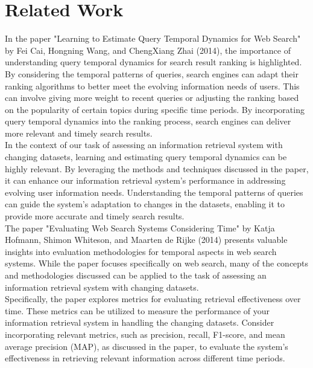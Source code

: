 \section{Related Work}
\label{sec:related}


In the paper "Learning to Estimate Query Temporal Dynamics for Web Search" by Fei Cai, 
Hongning Wang, and ChengXiang Zhai (2014), the importance of understanding query temporal 
dynamics for search result ranking is highlighted. By considering the temporal patterns of 
queries, search engines can adapt their ranking algorithms to better meet the evolving information 
needs of users. This can involve giving more weight to recent queries or adjusting the ranking 
based on the popularity of certain topics during specific time periods. By incorporating query 
temporal dynamics into the ranking process, search engines can deliver more relevant and timely 
search results.\\

In the context of our task of assessing an information retrieval system with changing datasets, 
learning and estimating query temporal dynamics can be highly relevant. By leveraging the methods 
and techniques discussed in the paper, it can enhance our information retrieval system's performance 
in addressing evolving user information needs. Understanding the temporal patterns of queries can 
guide the system's adaptation to changes in the datasets, enabling it to provide more accurate and 
timely search results. \\


The paper "Evaluating Web Search Systems Considering Time" by Katja Hofmann, Shimon Whiteson, and 
Maarten de Rijke (2014) presents valuable insights into evaluation methodologies for temporal aspects 
in web search systems. While the paper focuses specifically on web search, many of the concepts and 
methodologies discussed can be applied to the task of assessing an information retrieval system with 
changing datasets. \\

Specifically, the paper explores metrics for evaluating retrieval effectiveness over time. These metrics 
can be utilized to measure the performance of your information retrieval system in handling the changing 
datasets. Consider incorporating relevant metrics, such as precision, recall, F1-score, and mean average 
precision (MAP), as discussed in the paper, to evaluate the system's effectiveness in retrieving relevant 
information across different time periods.\\

